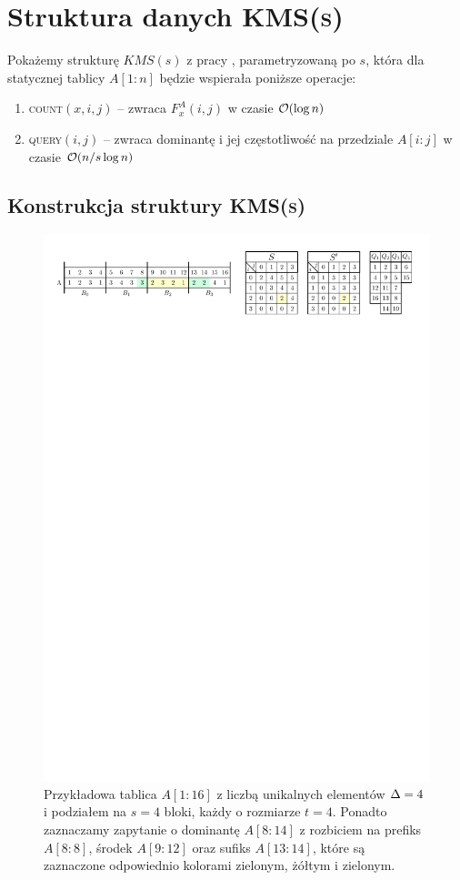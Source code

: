 \section{Struktura danych \textsc{KMS(s)}}
\label{sec:kms}
Pokażemy strukturę $KMS(s)$ z pracy \cite{kriz05}, parametryzowaną po $s$, która dla statycznej tablicy $A[1:n]$ będzie wspierała poniższe operacje:
\begin{enumerate}[nosep]
    \item \textsc{count}$(x,i,j)$ -- zwraca $F^A_x(i,j)$ w czasie $\mathcal{O}(\log n)$
    \item \textsc{query}$(i,j)$ -- zwraca dominantę i jej częstotliwość na przedziale $A[i:j]$ w czasie $\mathcal{O}(n/s \log n)$
\end{enumerate}
\subsection{Konstrukcja struktury \textsc{KMS(s)}}
\begin{figure}[H]
    \centering
    \includegraphics[scale=0.85]{images/kms.pdf}
    \caption{Przykładowa tablica $A[1:16]$ z liczbą unikalnych elementów $\Delta=4$ i podziałem na $s=4$ bloki, każdy o rozmiarze $t=4$. Ponadto zaznaczamy zapytanie o dominantę $A[8:14]$ z rozbiciem na prefiks $A[8:8]$, środek $A[9:12]$ oraz sufiks $A[13:14]$, które są zaznaczone odpowiednio kolorami zielonym, żółtym i zielonym.}
    \label{fig:kms}
\end{figure}
